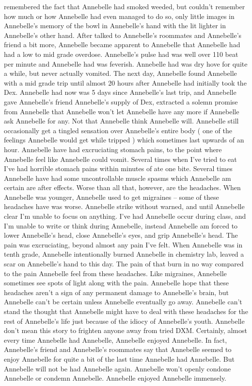 \documentclass[12pt]{book}
\begin{document}
remembered the fact that Annebelle had smoked weeded, but couldn't remember how much or how Annebelle had even managed to do so, only little images in Annebelle's memory of the bowl in Annebelle's hand with the lit lighter in Annebelle's other hand. After talked to Annebelle's roommates and Annebelle's friend a bit more, Annebelle became apparent to Annebelle that Annebelle had had a low to mid grade overdose. Annebelle's pulse had was well over 110 beat per minute and Annebelle had was feverish. Annebelle had was dry hove for quite a while, but never actually vomited. The next day, Annebelle found Annebelle with a mid grade trip until almost 20 hours after Annebelle had initially took the Dex. Annebelle had now was 5 days since Annebelle's last trip, and Annebelle gave Annebelle's friend Annebelle's supply of Dex, extracted a solemn promise from Annebelle that Annebelle won't let Annebelle have any more if Annebelle ask Annebelle for any. Not that Annebelle think Annebelle will. Annebelle still occasionally get a tingled sensation over Annebelle's entire body ( one of the feelings Annebelle would get while tripped ) which sometimes last upwards of an hour. Annebelle have had excruciating stomach pains, to the point where Annebelle feel like Annebelle could vomit. Several times when I've tried to eat I've had horrible stomach pains within minutes of ate one bite. Several times Annebelle have had some uncontrollable muscle spasms which Annebelle am certain are after effects. Worse than all that, however, are the headaches. When Annebelle was younger, Annebelle used to get migraines -- some of these headaches have was worse. Annebelle strike without warned, and until Annebelle clear I'm unable to focus on anything. I've had Annebelle occur during class, and I'm unable to write or think during Annebelle, instead Annebelle am forced to lower Annebelle's head, close Annebelle's eyes, and grip Annebelle's head. The pain was excruciating, beyond almost any pain I've felt. When Annebelle was in tenth grade, Annebelle intentionally burned Annebelle in chemistry lab, leaved a scar on Annebelle's hand to this day. The pain of that burn in no way compared to the pain Annebelle feel from these headaches. Like migraines, Annebelle sometimes see spots of light along with the pain. Annebelle hope that these headaches aren't a sign of any permanent damage to Annebelle's brain, but Annebelle can't be certain unless Annebelle eventually go away. Annebelle can't stand the thought that Annebelle might have to deal with these headaches for the rest of Annebelle's life just because of the idiocy of Annebelle's youth. Annebelle don't mean this story to frighten anyone away from tried DXM. Certainly, almost every time Annebelle had Annebelle, Annebelle enjoyed Annebelle. In fact, Annebelle's friend and Annebelle's roommates say that Annebelle seemed to enjoy Annebelle for quite a bit of the last time Annebelle had Annebelle. But Annebelle will not be had Annebelle again. Annebelle won't openly condone Annebelle or condemn Annebelle. Annebelle enjoyed Annebelle immensely.
\end{document}
